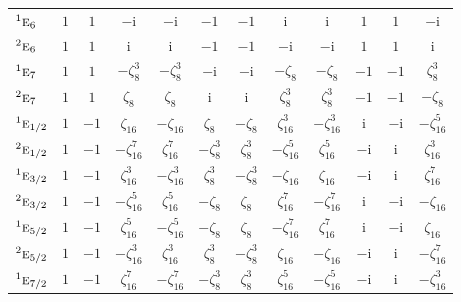 \documentclass[10pt,a4paper]{article}
\makeatletter
\def\grouprule#1#2{\noalign{\marks\LTgroupmarks{\the\belowrulesep}\nobreak\vskip#1%
  \vskip\aboverulesep}\multispan\LT@cols\unskip{\leaders\hrule\@height#2\hfill\kern\z@}\cr
  \noalign{\penalty\LTrulebreak\vskip\belowrulesep\global\@lastruleclass\z@}}
\numberwithin{equation}{section}
\newcommand{\irr}[1]{\text{\normalfont\scshape #1}}
\newcommand{\conjpair}[1]{{}^{#1}}
\newcommand{\iunit}{\mathrm{i}}
\newcommand{\rootunity}[1]{\zeta_{#1}}
\makeatother
\begin{document}
{\begin{longtable}{@{}lccccccccccc@{}}
$\conjpair{1}\irr{e}_{6}$ & $1$ & $1$ & $-\iunit{}$ & $-\iunit{}$ & $-1$ & $-1$ & $\iunit{}$ & $\iunit{}$ & $1$ & $1$ & $-\iunit{}$\\
$\conjpair{2}\irr{e}_{6}$ & $1$ & $1$ & $\iunit{}$ & $\iunit{}$ & $-1$ & $-1$ & $-\iunit{}$ & $-\iunit{}$ & $1$ & $1$ & $\iunit{}$\\
$\conjpair{1}\irr{e}_{7}$ & $1$ & $1$ & $-\rootunity{8}^{3}$ & $-\rootunity{8}^{3}$ & $-\iunit{}$ & $-\iunit{}$ & $-\rootunity{8}$ & $-\rootunity{8}$ & $-1$ & $-1$ & $\rootunity{8}^{3}$\\
$\conjpair{2}\irr{e}_{7}$ & $1$ & $1$ & $\rootunity{8}$ & $\rootunity{8}$ & $\iunit{}$ & $\iunit{}$ & $\rootunity{8}^{3}$ & $\rootunity{8}^{3}$ & $-1$ & $-1$ & $-\rootunity{8}$\\
\grouprule{0pt}{\lightrulewidth}
$\conjpair{1}\irr{e}_{1/2}$ & $1$ & $-1$ & $\rootunity{16}$ & $-\rootunity{16}$ & $\rootunity{8}$ & $-\rootunity{8}$ & $\rootunity{16}^{3}$ & $-\rootunity{16}^{3}$ & $\iunit{}$ & $-\iunit{}$ & $-\rootunity{16}^{5}$\\
$\conjpair{2}\irr{e}_{1/2}$ & $1$ & $-1$ & $-\rootunity{16}^{7}$ & $\rootunity{16}^{7}$ & $-\rootunity{8}^{3}$ & $\rootunity{8}^{3}$ & $-\rootunity{16}^{5}$ & $\rootunity{16}^{5}$ & $-\iunit{}$ & $\iunit{}$ & $\rootunity{16}^{3}$\\
$\conjpair{1}\irr{e}_{3/2}$ & $1$ & $-1$ & $\rootunity{16}^{3}$ & $-\rootunity{16}^{3}$ & $\rootunity{8}^{3}$ & $-\rootunity{8}^{3}$ & $-\rootunity{16}$ & $\rootunity{16}$ & $-\iunit{}$ & $\iunit{}$ & $\rootunity{16}^{7}$\\
$\conjpair{2}\irr{e}_{3/2}$ & $1$ & $-1$ & $-\rootunity{16}^{5}$ & $\rootunity{16}^{5}$ & $-\rootunity{8}$ & $\rootunity{8}$ & $\rootunity{16}^{7}$ & $-\rootunity{16}^{7}$ & $\iunit{}$ & $-\iunit{}$ & $-\rootunity{16}$\\
$\conjpair{1}\irr{e}_{5/2}$ & $1$ & $-1$ & $\rootunity{16}^{5}$ & $-\rootunity{16}^{5}$ & $-\rootunity{8}$ & $\rootunity{8}$ & $-\rootunity{16}^{7}$ & $\rootunity{16}^{7}$ & $\iunit{}$ & $-\iunit{}$ & $\rootunity{16}$\\
$\conjpair{2}\irr{e}_{5/2}$ & $1$ & $-1$ & $-\rootunity{16}^{3}$ & $\rootunity{16}^{3}$ & $\rootunity{8}^{3}$ & $-\rootunity{8}^{3}$ & $\rootunity{16}$ & $-\rootunity{16}$ & $-\iunit{}$ & $\iunit{}$ & $-\rootunity{16}^{7}$\\
$\conjpair{1}\irr{e}_{7/2}$ & $1$ & $-1$ & $\rootunity{16}^{7}$ & $-\rootunity{16}^{7}$ & $-\rootunity{8}^{3}$ & $\rootunity{8}^{3}$ & $\rootunity{16}^{5}$ & $-\rootunity{16}^{5}$ & $-\iunit{}$ & $\iunit{}$ & $-\rootunity{16}^{3}$\\

\end{longtable}}
\end{document}
